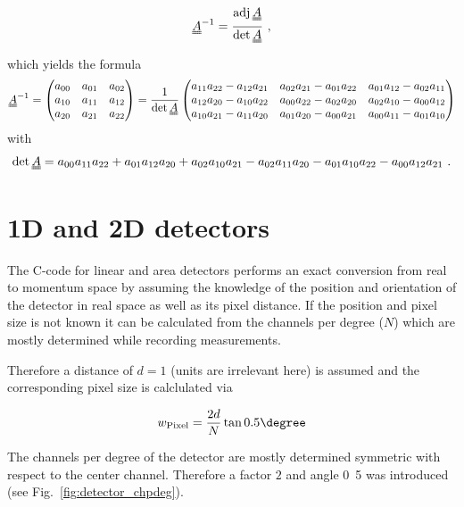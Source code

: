 \begin{align}
 \mat A^{-1} = \frac{\operatorname{adj} \mat A} {\operatorname{det} \mat A} \text{ ,} 
\end{align}
which yields the formula
\begin{align}
 \mat A^{-1} = \begin{pmatrix} a_{00} & a_{01} & a_{02} \\ 
                               a_{10} & a_{11} & a_{12} \\
                               a_{20} & a_{21} & a_{22} \end{pmatrix}
= \frac{1}{\operatorname{det}\mat A} 
\begin{pmatrix}
a_{11} a_{22} - a_{12} a_{21} & a_{02} a_{21} - a_{01} a_{22} & a_{01} a_{12} - a_{02} a_{11} \\
a_{12} a_{20} - a_{10} a_{22} & a_{00} a_{22} - a_{02} a_{20} & a_{02} a_{10} - a_{00} a_{12} \\
a_{10} a_{21} - a_{11} a_{20} & a_{01} a_{20} - a_{00} a_{21} & a_{00} a_{11} - a_{01} a_{10} 
\end{pmatrix}
\end{align}
with 
\begin{align}
 \operatorname{det} \mat A = a_{00}a_{11}a_{22} + a_{01}a_{12}a_{20} + a_{02}a_{10}a_{21} - a_{02}a_{11}a_{20} - a_{01}a_{10}a_{22} - a_{00}a_{12}a_{21} \text{ .}
\end{align}

\section{1D and 2D detectors}

The C-code for linear and area detectors performs an exact conversion from real to momentum space by assuming the knowledge of the position and orientation of the detector in real space as well as its pixel distance. If the position and pixel size is not known it can be calculated from the channels per degree ($N$) which are mostly determined while recording measurements.

Therefore a distance of $d=1$ (units are irrelevant here) is assumed and the corresponding pixel size is calclulated via

\begin{align}
 w_\text{Pixel} = \frac{2d}{N} \tan\unit{0.5}{\degree}
\end{align}

The channels per degree of the detector are mostly determined symmetric with respect to the center channel. Therefore a factor $2$ and angle \unit{0.5}{\degree} was introduced (see Fig.~\ref{fig:detector_chpdeg}).
 

